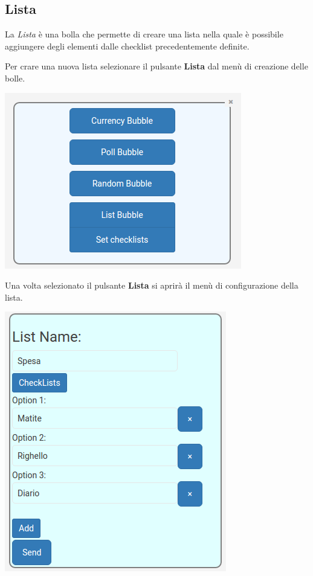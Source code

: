 \subsection{Lista}
\begin{flushleft}
La \textit{Lista} è una bolla che permette di creare una lista nella quale è possibile aggiungere degli elementi dalle checklist precedentemente definite.

Per crare una nuova lista selezionare il pulsante \textbf{Lista} dal menù di creazione delle bolle.\\
\begin{center}
\includegraphics[scale=0.75]{img/menu.png}
\end{center}
\newpage
Una volta selezionato il pulsante \textbf{Lista} si aprirà il menù di configurazione della lista.\\
\begin{center}
\includegraphics[scale=0.75]{img/list_conf.png}
\end{center}


\end{flushleft}
